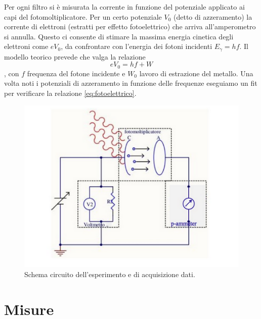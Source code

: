\documentclass[10pt,a4paper]{article}
\begin{document}
Per ogni filtro si è misurata la corrente in funzione del potenziale applicato ai capi del fotomoltiplicatore. Per un certo potenziale $V_0$ (detto di azzeramento) la corrente di elettroni (estratti per effetto fotoelettrico) che arriva all'amperometro si annulla. Questo ci consente di stimare la massima energia cinetica degli elettroni come $eV_0$, da confrontare con l'energia dei fotoni incidenti $E_{\gamma}=hf$. 
 Il modello teorico prevede che valga la relazione
 \begin{equation}\label{eq:fotoelettrico}
 eV_0 = hf + W
 \end{equation}, con $f$ frequenza del fotone incidente e $W_0$ lavoro di estrazione del metallo. Una volta noti i potenziali di azzeramento in funzione delle frequenze eseguiamo un fit per verificare la relazione \ref{eq:fotoelettrico}.
\begin{figure}[!htb]
  \centering
  \includegraphics[scale=1.0]{circuito.png}
\caption{Schema circuito dell'esperimento e di acquisizione dati.\label{circuito}}
\end{figure}


\section{Misure}
\end{document}
